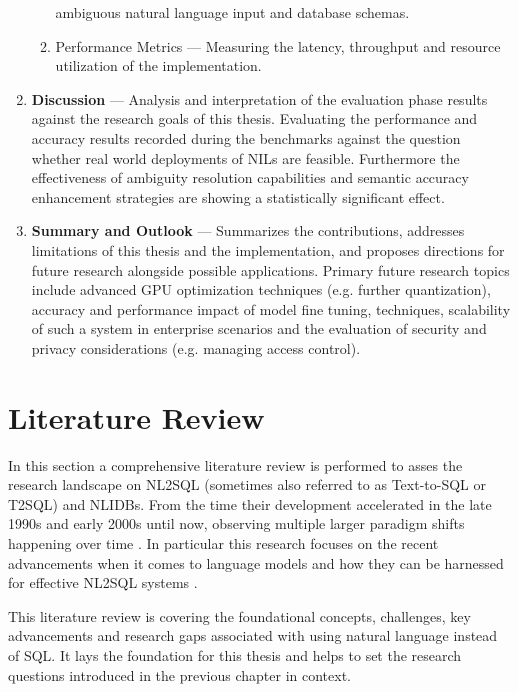 \documentclass{article}
\begin{document}
\begin{enumerate}
\begin{enumerate}
                    ambiguous natural language input and database schemas.
              \item Performance Metrics — Measuring the latency, throughput and resource utilization 
                    of the implementation.
          \end{enumerate}
      \item \textbf{Discussion} — Analysis and interpretation of the evaluation phase results against
            the research goals of this thesis. Evaluating the performance and accuracy results recorded
            during the benchmarks against the question whether real world deployments of NILs are feasible.
            Furthermore the effectiveness of ambiguity resolution capabilities and semantic accuracy enhancement
            strategies are showing a statistically significant effect.
       \item \textbf{Summary and Outlook} — Summarizes the contributions, addresses limitations
            of this thesis and the implementation, and proposes directions for future research alongside
            possible applications. Primary future research topics include advanced GPU optimization
            techniques (e.g. further quantization), accuracy and performance impact of model fine tuning,
            techniques, scalability of such a system in enterprise scenarios and the evaluation of security
            and privacy considerations (e.g. managing access control).
\end{enumerate}

\newpage

\section{Literature Review}

In this section a comprehensive literature review is performed to asses the research landscape on NL2SQL
(sometimes also referred to as Text-to-SQL or T2SQL) and NLIDBs. From the time their development accelerated in
the late 1990s and early 2000s \citep{NLIDBs, NLIDBTheory, ILPParsing, ILPParsing2} until now, observing multiple 
larger paradigm shifts happening over time \citep{GRAPPA, STRUG, Seq2SQL, NALIR, SQLizer}. In particular this 
research focuses on the recent advancements when it comes to language models and how they can be harnessed for
effective NL2SQL systems \citep{LLM-Sql, T2SQL-LLM-Bench, T2SQL-LLM-Bench-2, T2SQL-LLM-Bench-3, SPIDER2, BIRD}.

This literature review is covering the foundational concepts, challenges, key advancements and research gaps
associated with using natural language instead of SQL. It lays the foundation for this thesis and helps to set
the research questions introduced in the previous chapter in context.
\end{document}
